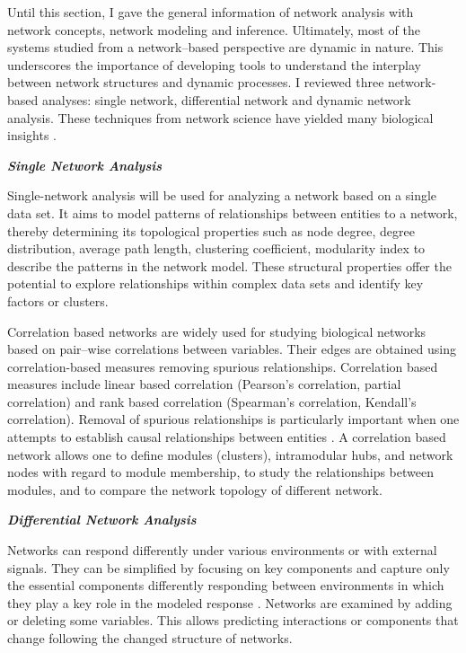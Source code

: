 Until this section, I gave the general information of network analysis with network concepts, network modeling and inference. Ultimately, most of the systems studied from a network--based perspective are dynamic in nature. This underscores the importance of developing tools to understand the interplay between network structures and dynamic processes. I reviewed three network-based analyses: single network, differential network and dynamic network analysis. These techniques from network science have yielded many biological insights \citep{Idekerdiffnet}.

\textbf{\textit{Single Network Analysis}}

Single-network analysis will be used for analyzing a network based on a single data set. It aims to model patterns of relationships between entities to a network, thereby determining its topological properties such as node degree, degree distribution, average path length, clustering coefficient, modularity index \citep{newman2006modularity} to describe the patterns in the network model. These structural properties offer the potential to explore relationships within complex data sets and identify key factors or clusters.

Correlation based networks are widely used for studying biological networks based on pair--wise correlations between variables. Their edges are obtained using correlation-based measures removing spurious relationships. Correlation based measures include linear based correlation (Pearson's correlation, partial correlation) and rank based correlation (Spearman's correlation, Kendall's correlation). Removal of spurious relationships is particularly important when one attempts to establish causal relationships between entities \citep{Toubiana:2013cv}. A correlation based network allows one to define modules (clusters), intramodular hubs, and network nodes with regard to module membership, to study the relationships between modules, and to compare the network topology of different network. 

\textbf{\textit{Differential Network Analysis}}

Networks can respond differently under various environments or with external signals. They can be simplified by focusing on key components and capture only the essential components differently responding between environments in which they play a key role in the modeled response \citep{Peer:2011jd}. Networks are examined by adding or deleting some variables. This allows predicting interactions or components that change following the changed structure of networks. 


